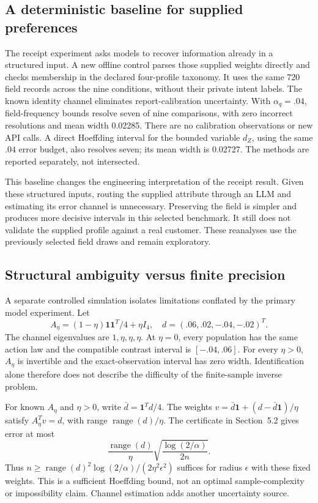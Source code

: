 \subsection{A deterministic baseline for supplied preferences}
The receipt experiment asks models to recover information already in a structured input. A new offline control parses those supplied weights directly and checks membership in the declared four-profile taxonomy. It uses the same 720 field records across the nine conditions, without their private intent labels. The known identity channel eliminates report-calibration uncertainty. With $\alpha_q=.04$, field-frequency bounds resolve seven of nine comparisons, with zero incorrect resolutions and mean width 0.02285. There are no calibration observations or new API calls. A direct Hoeffding interval for the bounded variable $d_Z$, using the same $.04$ error budget, also resolves seven; its mean width is 0.02727. The methods are reported separately, not intersected.

This baseline changes the engineering interpretation of the receipt result. Given these structured inputs, routing the supplied attribute through an LLM and estimating its error channel is unnecessary. Preserving the field is simpler and produces more decisive intervals in this selected benchmark. It still does not validate the supplied profile against a real customer. These reanalyses use the previously selected field draws and remain exploratory.

\subsection{Structural ambiguity versus finite precision}
A separate controlled simulation isolates limitations conflated by the primary model experiment. Let
\begin{equation}
 A_\eta=(1-\eta)\mathbf1\mathbf1^T/4+\eta I_4,
 \quad d=(.06,.02,-.04,-.02)^T.
\end{equation}
The channel eigenvalues are $1,\eta,\eta,\eta$. At $\eta=0$, every population has the same action law and the compatible contrast interval is $[-.04,.06]$. For every $\eta>0$, $A_\eta$ is invertible and the exact-observation interval has zero width. Identification alone therefore does not describe the difficulty of the finite-sample inverse problem.

For known $A_\eta$ and $\eta>0$, write $\bar d=\mathbf1^Td/4$. The weights $v=\bar d\mathbf1+(d-\bar d\mathbf1)/\eta$ satisfy $A_\eta^Tv=d$, with range $\operatorname{range}(d)/\eta$. The certificate in Section~5.2 gives error at most
\begin{equation}
 \frac{\operatorname{range}(d)}{\eta}
 \sqrt{\frac{\log(2/\alpha)}{2n}}.
\end{equation}
Thus $n\geq\operatorname{range}(d)^2\log(2/\alpha)/(2\eta^2\epsilon^2)$ suffices for radius $\epsilon$ with these fixed weights. This is a sufficient Hoeffding bound, not an optimal sample-complexity or impossibility claim. Channel estimation adds another uncertainty source.

